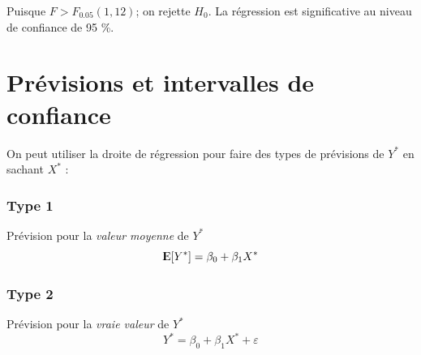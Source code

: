 \documentclass[11pt,french]{report}
\newcommand{\E}{{\rm I\kern-.3em E}}
\begin{document}
Puisque $F>F_{0.05}(1, 12)$; on rejette $H_0$. La régression est significative au niveau de confiance de 95 \%. \newline


\section{Prévisions et intervalles de confiance}
On peut utiliser la droite de régression pour faire des types de prévisions de $Y^*$ en sachant $X^*$ :
\subsubsection*{Type 1}
Prévision pour la \emph{valeur moyenne} de $Y^*$
$$
\E[Y^*] = \beta_0 + \beta_1X^*
$$

\subsubsection*{Type 2}
Prévision pour la \emph{vraie valeur} de $Y^*$
$$
Y^* = \beta_0 + \beta_1X^* + \varepsilon
$$
\end{document}
